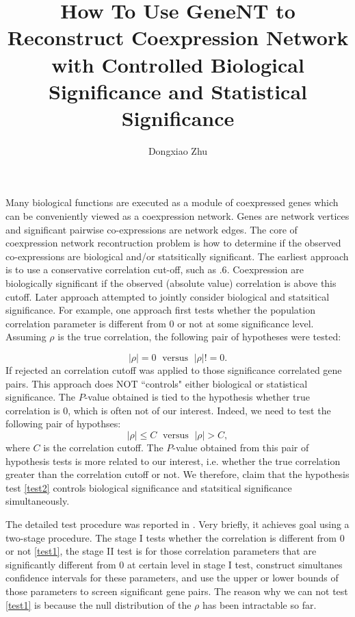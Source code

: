 \documentclass[a4paper]{article}
\title{How To Use GeneNT to Reconstruct Coexpression Network with Controlled Biological Significance and Statistical Significance}
\author{Dongxiao Zhu}
\begin{document}
\maketitle
Many biological functions are executed as a module of coexpressed
genes which can be conveniently viewed as a coexpression
network. Genes are network vertices and significant
pairwise co-expressions are network edges. The core of coexpression network
recontruction problem is how to determine if the observed co-expressions are 
biological and/or statsitically significant. The earliest approach is to use a 
conservative correlation cut-off, such as $.6$. Coexpression are biologically
significant if the observed (absolute value) correlation is above this cutoff. 
Later approach attempted to jointly consider biological and statsitical significance.
For example, one approach first tests whether the population correlation parameter 
is different from $0$ or not at some significance level. Assuming $\rho$ is the 
true correlation, the following pair of hypotheses were tested:

\begin{equation}\label{test1}
|\rho| = 0 \; \mbox{ versus } \; |\rho| !=0.
\end{equation}
If rejected an correlation cutoff was applied to those significance correlated 
gene pairs. This approach does NOT ``controls" either biological or statistical significance. 
The $P$-value obtained is tied to the hypothesis whether true correlation is $0$, 
which is often not of our interest. Indeed, we need to test the following pair of 
hypothses:
\begin{equation}\label{test2}
|\rho| \leq C \; \mbox{ versus } \; |\rho| > C,
\end{equation}
where $C$ is the correlation cutoff. The $P$-value obtained from this pair of hypothesis
tests is more related to our interest, i.e. whether the true correlation greater 
than the correlation cutoff or not. We therefore, claim that the hypothesis test \ref{test2}
controls biological significance and statsitical significance simultaneously. 

The detailed test procedure was reported in \cite{Zhu05a}. Very briefly, it achieves
goal using a two-stage procedure. The stage I tests whether the correlation
is different from $0$ or not \ref{test1}, the stage II test is for those correlation 
parameters that are significantly different from $0$ at certain level in stage I test, 
construct simultanes confidence intervals for these parameters, and use the upper 
or lower bounds of those parameters to screen significant gene pairs. The reason
why we can not test \ref{test1} is because the null distribution of the $\rho$ has
been intractable so far.    
\end{document}
